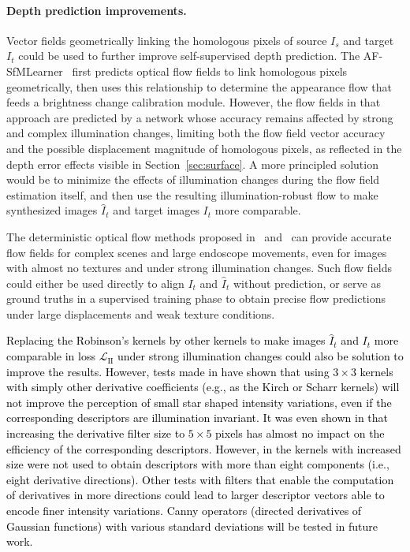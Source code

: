 \documentclass[a4paper,fleqn]{cas-dc}
\begin{document}
\paragraph{Depth prediction improvements.}
Vector fields geometrically linking the homologous pixels of source $I_s$ and target $I_t$ could be used to further improve self-supervised depth prediction. The AF-SfMLearner~\citep{Shao_MIA_2022} first predicts optical flow fields to link homologous pixels geometrically, then uses this relationship to determine the appearance flow that feeds a brightness change calibration module. However, the flow fields in that approach are predicted by a network whose accuracy remains affected by strong and complex illumination changes, limiting both the flow field vector accuracy and the possible displacement magnitude of homologous pixels, as reflected in the depth error effects visible in Section~\ref{sec:surface}. A more principled solution would be to minimize the effects of illumination changes during the flow field estimation itself, and then use the resulting illumination-robust flow to make synthesized images $\hat{I}_t$ and target images $I_t$ more comparable. 
%

The deterministic optical flow methods proposed in~\citep{Trinh_CVIU_2019} and~\citep{Weibel_PR_2012} can provide accurate flow fields for complex scenes and large endoscope movements, even for images with almost no textures and under strong illumination changes. Such flow fields could either be used directly to align $I_t$ and $\hat{I}_t$ without prediction, or serve as ground truths in a supervised training phase to obtain precise flow predictions under large displacements and weak texture conditions.

\textcolor{black}{
Replacing the Robinson's kernels by other kernels to make images $\hat{I}_t$ and $I_t$ more comparable in loss $\mathcal{L}_{\textrm{II}}$ under strong illumination changes could also be solution to improve the results. However, tests made in \citep{Trinh_CVIU_2019} have shown that using $3\times 3$ kernels with simply other derivative coefficients (e.g., as the Kirch or Scharr kernels) will not improve the perception of small star shaped intensity variations, even if the corresponding descriptors are illumination invariant. It was even shown in \citep{Daul2026SPIE} that increasing the derivative filter size to $5\times 5$ pixels has almost no impact on the efficiency of the corresponding descriptors. However, in \citep{Daul2026SPIE} the kernels with increased size were not used to obtain descriptors with more than eight components (i.e., eight derivative directions). Other tests with filters that enable the computation of derivatives in more directions could lead to larger descriptor vectors able to encode finer intensity variations. Canny operators (directed derivatives of Gaussian functions) with various standard deviations will be tested in future work.}        
%
\end{document}
